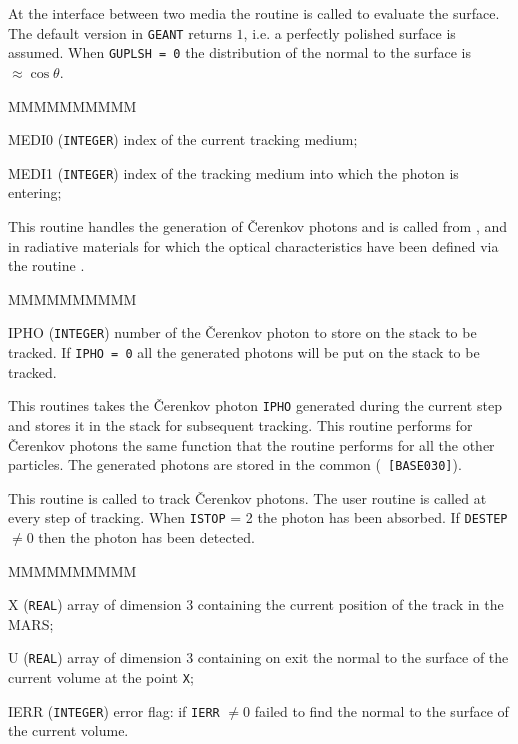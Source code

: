 At the interface between two media the routine is called to evaluate the
surface. The default version in {\tt GEANT} returns $1$, i.e. a perfectly
polished surface is assumed. When {\tt GUPLSH = 0} the distribution of the
normal to the surface is $\approx \cos \theta$.
\begin{DLtt}{MMMMMMMMMM}
\item[MEDI0] ({\tt INTEGER}) index of the current tracking medium;
\item[MEDI1] ({\tt INTEGER}) index of the tracking medium into which the
photon is entering;
\end{DLtt}


This routine handles the generation of \v{C}erenkov photons and is called
from ,  and  in radiative
materials for which
the optical characteristics have been defined via the routine .


\begin{DLtt}{MMMMMMMMMM}
\item[IPHO] ({\tt INTEGER}) number of the \v{C}erenkov photon to store
on the stack to be tracked. If {\tt IPHO = 0} all the generated photons
will be put on the stack to be tracked.
\end{DLtt}

This routines takes the \v{C}erenkov photon {\tt IPHO} generated during
the current step and stores it in the stack for subsequent tracking.
This routine performs for \v{C}erenkov photons the same function that
the  routine performs for all the other particles. The
generated photons are stored in the common  ({\tt 
[BASE030]}).


This routine is called to track \v{C}erenkov photons. The user routine
 is called at every step of tracking. When {\tt ISTOP} = 2
the photon has been absorbed. If {\tt DESTEP} $\neq 0$ then the photon
has been detected.


\begin{DLtt}{MMMMMMMMMM}
\item[X] ({\tt REAL}) array of dimension 3 containing the current position
of the track in the MARS;
\item[U] ({\tt REAL}) array of dimension 3 containing on exit the normal to
the surface of the current volume at the point {\tt X};
\item[IERR] ({\tt INTEGER}) error flag: if {\tt IERR} $\neq 0$ 
failed to find the normal to the surface of the current volume.
\end{DLtt}

